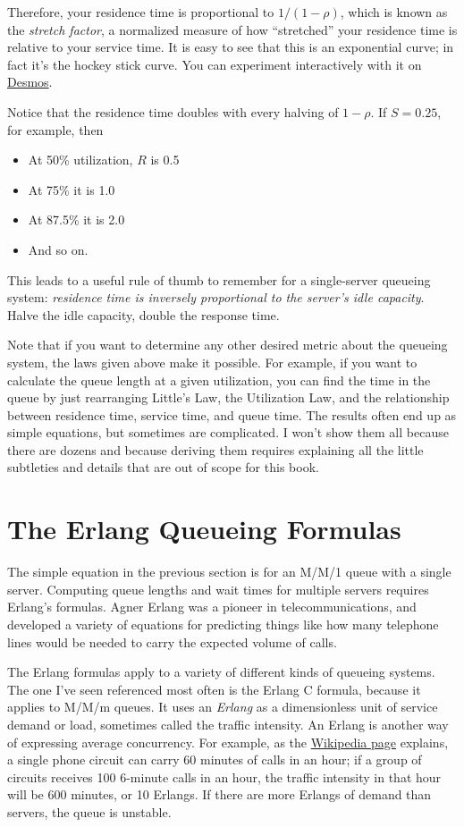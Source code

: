 \documentclass{vivid_layout_pdf}
\begin{document}
Therefore, your residence time is proportional to \( 1/(1-\rho) \), which is known as the {\itshape stretch factor}, a normalized measure of how ``stretched'' your residence time is relative to your service time. It is easy to see that this is an exponential curve; in fact it's the hockey stick curve. You can experiment interactively with it on \href{https://www.desmos.com/calculator/vhvwh6vjo7}{Desmos}.

Notice that the residence time doubles with every halving of \( 1-\rho \). If \( S = 0.25 \), for example, then

\begin{itemize}
\item At 50\% utilization, \( R \) is 0.5
\item At 75\% it is 1.0
\item At 87.5\% it is 2.0
\item And so on.
\end{itemize}

This leads to a useful rule of thumb to remember for a single-server queueing system: {\itshape residence time is inversely proportional to the server's idle capacity}. Halve the idle capacity, double the response time.

Note that if you want to determine any other desired metric about the queueing system, the laws given above make it possible. For example, if you want to calculate the queue length at a given utilization, you can find the time in the queue by just rearranging Little's Law, the Utilization Law, and the relationship between residence time, service time, and queue time. The results often end up as simple equations, but sometimes are complicated. I won't show them all because there are dozens and because deriving them requires explaining all the little subtleties and details that are out of scope for this book.

\section{The Erlang Queueing Formulas}

The simple equation in the previous section is for an M/M/1 queue with a single server. Computing queue lengths and wait times for multiple servers requires Erlang's formulas. Agner Erlang was a pioneer in telecommunications, and developed a variety of equations for predicting things like how many telephone lines would be needed to carry the expected volume of calls.

The Erlang formulas apply to a variety of different kinds of queueing systems. The one I've seen referenced most often is the Erlang C formula, because it applies to M/M/m queues. It uses an {\itshape Erlang} as a dimensionless unit of service demand or load, sometimes called the traffic intensity. An Erlang is another way of expressing average concurrency. For example, as the \href{http://en.wikipedia.org}{Wikipedia page} explains, a single phone circuit can carry 60 minutes of calls in an hour; if a group of circuits receives 100 6-minute calls in an hour, the traffic intensity in that hour will be 600 minutes, or 10 Erlangs. If there are more Erlangs of demand than servers, the queue is unstable.
\end{document}
